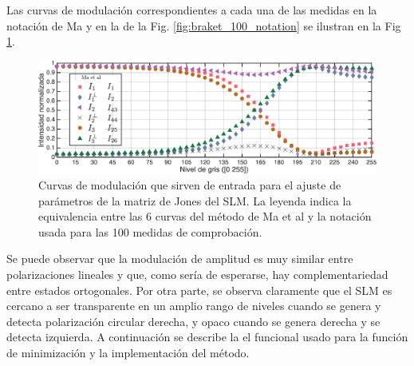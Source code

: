 Las curvas de modulación correspondientes a cada una de las medidas en
la notación de Ma y en la de la Fig. \ref{fig:braket_100_notation} se
ilustran en la Fig \ref{fig:six_input_measures}. 
\begin{figure}[h!]
\centering
\includegraphics[scale=.55]{six_input_measures.pdf}
\caption[Curvas de modulación que sirven de entrada para el ajuste de
parámetros de la matriz de Jones del SLM]{Curvas de modulación que
  sirven de entrada para el ajuste de parámetros de la matriz de Jones
  del SLM. La leyenda indica la equivalencia entre las 6 curvas del
  método de Ma et al y la notación usada para las 100 medidas de comprobación. }
\label{fig:six_input_measures}
\end{figure}
Se puede observar que la modulación de amplitud es muy similar entre
polarizaciones lineales y que, como sería de esperarse, hay
complementariedad entre estados ortogonales.  Por otra parte, se
observa claramente que el SLM es cercano a ser transparente en un
amplio rango de niveles cuando se genera y detecta polarización
circular derecha, y opaco cuando se genera derecha y se detecta izquierda.
A continuación se describe la el funcional usado para la función de
minimización y la implementación del método. 
